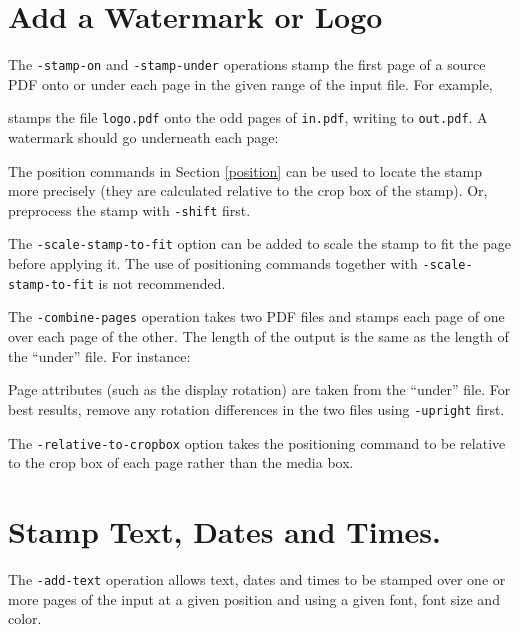 \documentclass{book}
\begin{document}
\section{Add a Watermark or Logo}
  The \texttt{-stamp-on} and \texttt{-stamp-under} operations stamp the first
page of a source PDF onto or under each page in the given range of the input
file. For example,

\noindent{}
\noindent stamps the file \texttt{logo.pdf} onto the odd pages of \texttt{in.pdf},
writing to \texttt{out.pdf}. A watermark should go underneath each page:

\noindent{}


\noindent The position commands in Section \ref{position} can be used to locate the stamp more precisely (they are calculated relative to the crop box of the stamp). Or, preprocess the stamp with \texttt{-shift} first.

The \texttt{-scale-stamp-to-fit} option can be added to scale the stamp to fit the page before applying it. The use of positioning commands together with \texttt{-scale-stamp-to-fit} is not recommended.

  The \texttt{-combine-pages} operation takes two PDF files and stamps each
page of one over each page of the other. The length of the output is the same
as the length of the ``under'' file. For instance:

\noindent{}

\noindent Page attributes (such as the display rotation) are taken from the ``under''
file. For best results, remove any rotation differences in the two files using
\texttt{-upright} first.

\noindent The \texttt{-relative-to-cropbox} option takes the positioning command to be relative to the crop box of each page rather than the media box.



  \section{Stamp Text, Dates and Times.}
  The \texttt{-add-text} operation allows text, dates and times to be stamped
over one or more pages of the input at a given position and using a given font,
font size and color.
\end{document}

